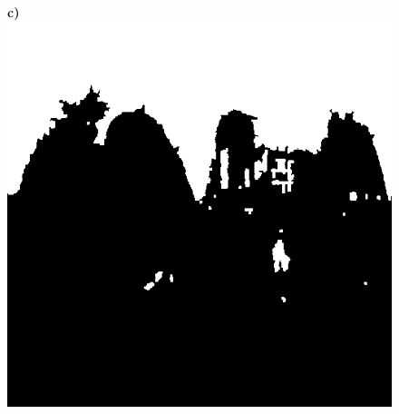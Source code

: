 \documentclass{article}
\begin{document}
\begin{figure}
\textbf{\scriptsize{c)}}\includegraphics[scale=0.27]{Images/2/FloodfillOutput.png}
\end{figure} 

\clearpage %
\end{document}

